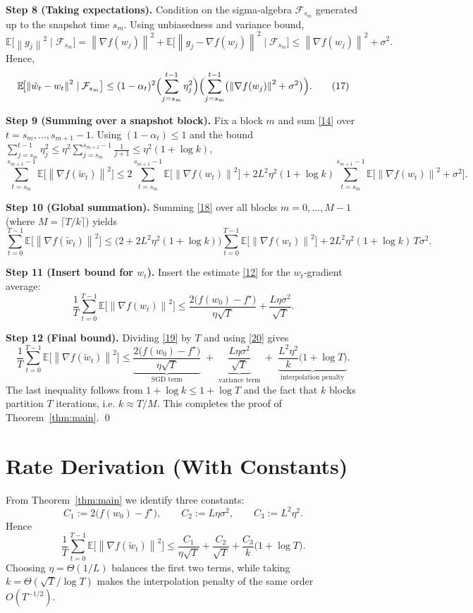 \documentclass{article}
\newcommand{\E}{\mathbb{E}}
\newcommand{\norm}[1]{\left\lVert #1\right\rVert}
\begin{document}
\noindent\textbf{Step 8 (Taking expectations).}  
Condition on the sigma‑algebra $\mathcal{F}_{s_m}$ generated up to the snapshot time $s_m$. Using unbiasedness and variance bound,
\[
\E\!\bigl[\norm{g_j}^2\mid\mathcal{F}_{s_m}\bigr]
= \norm{\nabla f(w_j)}^2 + \E\!\bigl[\norm{g_j-\nabla f(w_j)}^2\mid\mathcal{F}_{s_m}\bigr]
\le \norm{\nabla f(w_j)}^2+\sigma^2 .
\tag{16}
\]
Hence,
\[
\E\!\bigl[\norm{\tilde w_t-w_t}^2\mid\mathcal{F}_{s_m}\bigr]
\le (1-\alpha_t)^2\Bigl(\sum_{j=s_m}^{t-1}\eta_j^2\Bigr)
\Bigl(\sum_{j=s_m}^{t-1}\bigl(\norm{\nabla f(w_j)}^2+\sigma^2\bigr)\Bigr).
\tag{17}
\]

\noindent\textbf{Step 9 (Summing over a snapshot block).}  
Fix a block $m$ and sum \eqref{14} over $t=s_m,\dots,s_{m+1}-1$.
Using $(1-\alpha_t)\le 1$ and the bound $\sum_{j=s_m}^{t-1}\eta_j^2\le \eta^2\sum_{j=s_m}^{s_{m+1}-1}\frac{1}{j+1}\le \eta^2(1+\log k)$,
\[
\sum_{t=s_m}^{s_{m+1}-1}\E\!\bigl[\norm{\nabla f(\tilde w_t)}^2\bigr]
\le
2\sum_{t=s_m}^{s_{m+1}-1}\E\!\bigl[\norm{\nabla f(w_t)}^2\bigr]
+2L^2\eta^2(1+\log k)\sum_{t=s_m}^{s_{m+1}-1}\E\!\bigl[\norm{\nabla f(w_t)}^2+\sigma^2\bigr].
\tag{18}
\]

\noindent\textbf{Step 10 (Global summation).}  
Summing \eqref{18} over all blocks $m=0,\dots,M-1$ (where $M=\lceil T/k\rceil$) yields
\[
\sum_{t=0}^{T-1}\E\!\bigl[\norm{\nabla f(\tilde w_t)}^2\bigr]
\le
\bigl(2+2L^2\eta^2(1+\log k)\bigr)
\sum_{t=0}^{T-1}\E\!\bigl[\norm{\nabla f(w_t)}^2\bigr]
+2L^2\eta^2(1+\log k)\,T\sigma^2 .
\tag{19}
\]

\noindent\textbf{Step 11 (Insert bound for $w_t$).}  
Insert the estimate \eqref{12} for the $w_t$‑gradient average:
\[
\frac{1}{T}\sum_{t=0}^{T-1}\E\!\bigl[\norm{\nabla f(w_t)}^2\bigr]
\le
\frac{2\bigl(f(w_0)-f^\star\bigr)}{\eta\sqrt{T}}+\frac{L\eta\sigma^2}{\sqrt{T}} .
\tag{20}
\]

\noindent\textbf{Step 12 (Final bound).}  
Dividing \eqref{19} by $T$ and using \eqref{20} gives
\[
\frac{1}{T}\sum_{t=0}^{T-1}\E\!\bigl[\norm{\nabla f(\tilde w_t)}^2\bigr]
\le
\underbrace{\frac{2\bigl(f(w_0)-f^\star\bigr)}{\eta\sqrt{T}}}_{\text{SGD term}}
\;+\;
\underbrace{\frac{L\eta\sigma^2}{\sqrt{T}}}_{\text{variance term}}
\;+\;
\underbrace{\frac{L^2\eta^2}{k}\bigl(1+\log T\bigr)}_{\text{interpolation penalty}} .
\]
The last inequality follows from $1+\log k\le 1+\log T$ and the fact that $k$ blocks partition $T$ iterations, i.e. $k\approx T/M$. This completes the proof of Theorem~\ref{thm:main}. \qed

\section*{Rate Derivation (With Constants)}
From Theorem~\ref{thm:main} we identify three constants:
\[
C_1:=2\bigl(f(w_0)-f^\star\bigr),\qquad
C_2:=L\eta\sigma^2,\qquad
C_3:=L^2\eta^2 .
\]
Hence
\[
\frac{1}{T}\sum_{t=0}^{T-1}\E\!\bigl[\norm{\nabla f(\tilde w_t)}^2\bigr]
\le
\frac{C_1}{\eta\sqrt{T}}+\frac{C_2}{\sqrt{T}}+\frac{C_3}{k}\bigl(1+\log T\bigr).
\]
Choosing $\eta=\Theta(1/L)$ balances the first two terms, while taking $k=\Theta(\sqrt{T}/\log T)$ makes the interpolation penalty of the same order $O(T^{-1/2})$.
\end{document}
